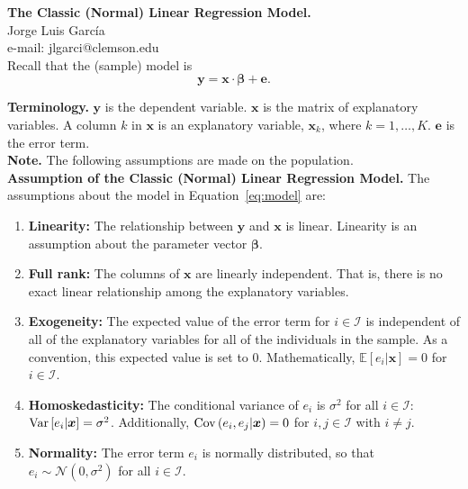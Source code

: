 
\let\counterwithout\relax
\let\counterwithin\relax
{}



\noindent \textbf{The Classic (Normal) Linear Regression Model.}\\
\noindent Jorge Luis García \\
\noindent e-mail: jlgarci@clemson.edu\\

\noindent Recall that the (sample) model is
\begin{equation}
\bm{y} = \bm{x} \cdot \bm{\beta} + \bm{e}. \label{eq:model}
\end{equation}

\noindent \textbf{Terminology.} $\bm{y}$ is the dependent variable. $\bm{x}$ is the matrix of explanatory variables. A column $k$ in $\bm{x}$ is an explanatory variable, $\bm{x}_k$, where $k = 1, \ldots, K$. $\bm{e}$ is the error term.\\

\noindent \textbf{Note.} The following assumptions are made on the population.\\

\noindent \textbf{Assumption of the Classic (Normal) Linear Regression Model.} The assumptions about the model in Equation~\eqref{eq:model} are:
\begin{enumerate}
	\item \textbf{Linearity:} The relationship between $\bm{y}$ and $\bm{x}$ is linear. Linearity is an assumption about the parameter vector $\bm{\beta}$. 
	\item \textbf{Full rank:} The columns of $\bm{x}$ are linearly independent. That is, there is no exact linear relationship among the explanatory variables.	
	\item \textbf{Exogeneity:} The expected value of the error term for $i \in \mathcal{I}$ is independent of all of the explanatory variables for all of the individuals in the sample. As a convention, this expected value is set to $0$. Mathematically, $\mathbb{E} \left[ e_i | \bm{x} \right] = 0$ for $i \in \mathcal{I}$. 
	\item \textbf{Homoskedasticity:} The conditional variance of $e_i$ is $\sigma^2$ for all $i \in \mathcal{I}$: $\operatorname{Var} \left[ e_i | \bm{x} \right] = \sigma^2$. Additionally, $\operatorname{Cov} \left( e_i , e_j | \bm{x} \right) = 0$ for $i,j \in \mathcal{I}$ with $i \neq j$. 
	\item \textbf{Normality:} The error term $e_i$ is normally distributed, so that $e_i \sim \mathcal{N} \left( 0, \sigma^2 \right)$ for all $i \in \mathcal{I}$. 
\end{enumerate}

